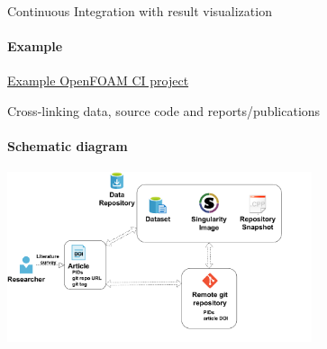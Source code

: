\documentclass[
	aspectratio=169,%
	color={accentcolor=2d},
	logo=true,%
	colorframetitle=true,%
	]{tudabeamer}
\begin{document}
\begin{frame}{Continuous Integration with result visualization} 
    \framesubtitle{Example}

    \vfill
    \begin{center}
        \href{https://gitlab.com/tmaric/fvc-reconstruct/-/pipelines/276526868}{Example OpenFOAM CI project} 
    \end{center}

\end{frame}

\begin{frame}{Cross-linking data, source code and reports/publications} 
	\framesubtitle{Schematic diagram}
	
	\begin{center}
		\includegraphics[width=0.67\textwidth]{figures/cross-linking.pdf}
	\end{center}

\end{frame}
\end{document}
